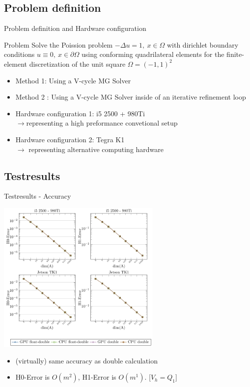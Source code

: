\documentclass[10pt]{beamer}
\begin{document}
\subsection{Problem definition}
\begin{frame}{Problem definition and Hardware configuration}
\begin{block}{Problem}
Solve the Poission problem $- \Delta u = 1,~x\in\Omega$ with dirichlet boundary conditions $u \equiv 0,~x\in \partial \Omega$ using conforming quadrilateral 
elements for the finite-element discretization of the unit square $\Omega = 
(-1,1)^2$
\end{block}

\begin{itemize}
\item Method 1: Using a V-cycle MG Solver
\item Method 2 : Using a V-cycle MG Solver inside of an iterative refinement loop
\end{itemize}

\begin{itemize}
 \item Hardware configuration 1: i5 2500 + 980Ti \\$\rightarrow$representing a high preformance convetional setup
 \item Hardware configuration 2: Tegra K1 \\$\rightarrow$ representing alternative computing hardware
\end{itemize}



\end{frame}

\subsection{Testresults}
\begin{frame}{Testresults - Accuracy}
 \begin{center}
  \includegraphics[width=0.6\textwidth]{figures/z-plots2.pdf}
 \end{center}

\begin{itemize}
 \item (virtually) same accuracy as double calculation
 \item H0-Error is $O(m^2)$, H1-Error is $O(m^1)$. [$V_h = Q_1$]
\end{itemize}
\end{frame}
\end{document}

